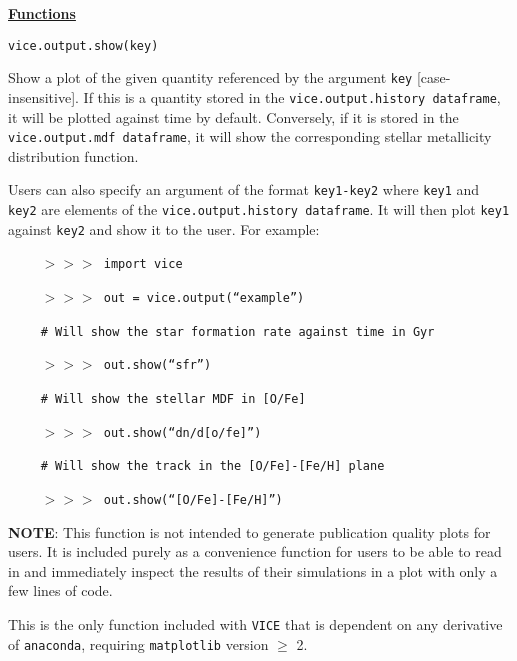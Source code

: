 \documentclass{report}
\begin{document}
\par\null\par\noindent
\underline{\textbf{Functions}} 
\par\null\par\noindent
\texttt{vice.output.show(key)}
\par
Show a plot of the given quantity referenced by the argument \texttt{key} 
[case-insensitive]. If this is a quantity stored in the 
\texttt{vice.output.history dataframe}, it will be plotted against time by 
default. Conversely, if it is stored in the \texttt{vice.output.mdf dataframe}, 
it will show the corresponding stellar metallicity distribution function. 
\par
Users can also specify an argument of the format \texttt{key1-key2} where 
\texttt{key1} and \texttt{key2} are elements of the 
\texttt{vice.output.history dataframe}. It will then plot \texttt{key1} against 
\texttt{key2} and show it to the user. For example: 
\par$\qquad$
\texttt{$>>>$ import vice} 
\par$\qquad$ 
\texttt{$>>>$ out = vice.output(``example'')} 
\par$\qquad$ 
\texttt{\# Will show the star formation rate against time in Gyr}
\par$\qquad$ 
\texttt{$>>>$ out.show(``sfr'')}
\par$\qquad$ 
\texttt{\# Will show the stellar MDF in [O/Fe]} 
\par$\qquad$ 
\texttt{$>>>$ out.show(``dn/d[o/fe]'')}
\par$\qquad$ 
\texttt{\# Will show the track in the [O/Fe]-[Fe/H] plane} 
\par$\qquad$ 
\texttt{$>>>$ out.show(``[O/Fe]-[Fe/H]'')}
\par
\textbf{NOTE}: This function is not intended to generate publication quality 
plots for users. It is included purely as a convenience function for users to 
be able to read in and immediately inspect the results of their simulations 
in a plot with only a few lines of code. 
\par
This is the only function included with \texttt{VICE} that is dependent on 
any derivative of \texttt{anaconda}, requiring \texttt{matplotlib} version 
$\geq$ 2. 
\end{document}
